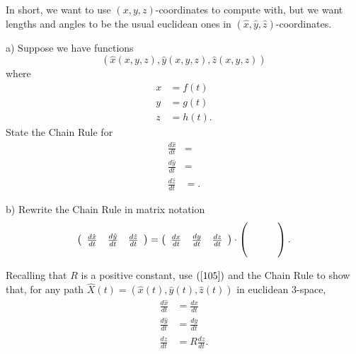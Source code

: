 \documentclass{ximera}
\begin{document}
In short, we want to use $\left(  x,y,z\right)  $-coordinates to compute with,
but we want lengths and angles to be the usual euclidean ones in $\left(
\hat{x},\hat{y},\hat{z}\right)  $-coordinates.

\begin{exercise}
a) Suppose we have functions%
\[
\left(  \hat{x}\left(  x,y,z\right)  ,\hat{y}\left(  x,y,z\right)  ,\hat
{z}\left(  x,y,z\right)  \right)
\]
where%
\begin{align*}
x  &  =f\left(  t\right) \\
y  &  =g\left(  t\right) \\
z  &  =h\left(  t\right)  .
\end{align*}
State the Chain Rule for%
\begin{align*}
\frac{d\hat{x}}{dt}  &  =\\
\frac{d\hat{y}}{dt}  &  =\\
\frac{d\hat{z}}{dt}  &  =.
\end{align*}


b) Rewrite the Chain Rule in matrix notation%
\[
\left(
\begin{array}
[c]{ccc}%
\frac{d\hat{x}}{dt} & \frac{d\hat{y}}{dt} & \frac{d\hat{z}}{dt}%
\end{array}
\right)  =\left(
\begin{array}
[c]{ccc}%
\frac{dx}{dt} & \frac{dy}{dt} & \frac{dz}{dt}%
\end{array}
\right)  \cdot\left(
\begin{array}
[c]{ccc}
&  & \\
&  & \\
&  &
\end{array}
\right)  .
\]

\end{exercise}

\begin{exercise}
\label{8} Recalling that $R$ is a positive constant, use $\left(
\ref{105}\right)  $ and the Chain Rule to show that, for any path $\hat
{X}\left(  t\right)  =\left(  \hat{x}\left(  t\right)  ,\hat{y}\left(
t\right)  ,\hat{z}\left(  t\right)  \right)  $ in euclidean $3$-space,%
\begin{align*}
\frac{d\hat{x}}{dt}  &  =\frac{dx}{dt}\\
\frac{d\hat{y}}{dt}  &  =\frac{dy}{dt}\\
\frac{d\hat{z}}{dt}  &  =R\frac{dz}{dt}.
\end{align*}

\end{exercise}
\end{document}
